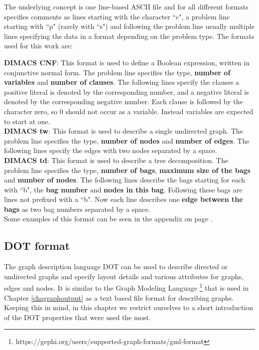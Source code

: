 \documentclass[a4paper, 12pt, bibliography=totoc]{scrartcl}
\begin{document}
The underlying concept is one line-based ASCII file and for all different formats specifies comments as lines starting with the character ``c", a problem line starting with ``p" (rarely with ``s") and following the problem line usually multiple lines specifying the data in a format depending on the problem type.
The formats used for this work are:

\textbf{DIMACS CNF}: This format is used to define a Boolean expression, written in conjunctive normal form. The problem line specifies the type, \textbf{number of variables} and \textbf{number of clauses}. The following lines specify the clauses a positive literal is denoted by the corresponding number, and a negative literal is denoted by the corresponding negative number. Each clause is followed by the character zero, so 0 should not occur as a variable. Instead variables are expected to start at one.\\

\textbf{DIMACS tw}: This format is used to describe a single undirected graph. The problem line specifies the type, \textbf{number of nodes} and \textbf{number of edges}. The following lines specify the edges with two nodes separated by a space.\\

\textbf{DIMACS td}: This format is used to describe a tree decomposition. The problem line specifies the type, \textbf{number of bags}, \textbf{maximum size of the bags} and \textbf{number of nodes}. The following lines describe the bags starting for each with ``b", the \textbf{bag number} and \textbf{nodes in this bag}. Following these bags are lines not prefixed with a ``b". Now each line describes one \textbf{edge between the bags} as two bag numbers separated by a space.\\


Some examples of this format can be seen in the appendix on page \pageref{app:input}.

\subsection{DOT format}
The graph description language DOT can be used to describe directed or undirected graphs and specify layout details and various attributes for graphs, edges and nodes. It is similar to the Graph Modeling Language \footnote{https://gephi.org/users/supported-graph-formats/gml-format} that is used in Chapter \ref{chagraphoutput} as a text based file format for describing graphs. Keeping this in mind, in this chapter we restrict ourselves to a short introduction of the DOT properties that were used the most.
\end{document}
